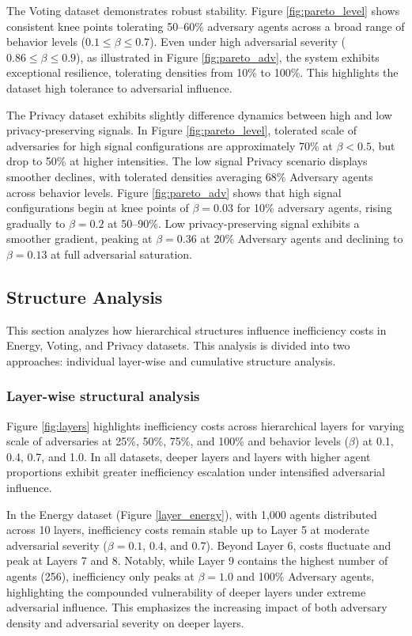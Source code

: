 \documentclass[journal]{IEEEtran}
\begin{document}
The Voting dataset demonstrates robust stability. Figure \ref{fig:pareto_level} shows consistent knee points tolerating 50--60\% adversary agents across a broad range of behavior levels ($0.1 \leq \beta \leq 0.7$). Even under high adversarial severity ($0.86 \leq \beta \leq 0.9$), as illustrated in Figure \ref{fig:pareto_adv}, the system exhibits exceptional resilience, tolerating densities from 10\% to 100\%. This highlights the dataset high tolerance to adversarial influence.

The Privacy dataset exhibits slightly difference dynamics between high and low privacy-preserving signals. In Figure \ref{fig:pareto_level}, tolerated scale of adversaries for high signal configurations are approximately 70\% at $\beta < 0.5$, but drop to 50\% at higher intensities. The low signal Privacy scenario displays smoother declines, with tolerated densities averaging 68\% Adversary agents across behavior levels. Figure \ref{fig:pareto_adv} shows that high signal configurations begin at knee points of $\beta = 0.03$ for 10\% adversary agents, rising gradually to $\beta = 0.2$ at 50--90\%. Low privacy-preserving signal exhibits a smoother gradient, peaking at $\beta = 0.36$ at 20\% Adversary agents and declining to $\beta = 0.13$ at full adversarial saturation.

\subsection{Structure Analysis}
This section analyzes how hierarchical structures influence inefficiency costs in Energy, Voting, and Privacy datasets. This analysis is divided into two approaches: individual layer-wise and cumulative structure analysis.

\subsubsection{Layer-wise structural analysis}
Figure \ref{fig:layers} highlights inefficiency costs across hierarchical layers for varying scale of adversaries at 25\%, 50\%, 75\%, and 100\% and behavior levels ($\beta$) at 0.1, 0.4, 0.7, and 1.0. In all datasets, deeper layers and layers with higher agent proportions exhibit greater inefficiency escalation under intensified adversarial influence.

In the Energy dataset (Figure \ref{layer_energy}), with 1,000 agents distributed across 10 layers, inefficiency costs remain stable up to Layer 5 at moderate adversarial severity ($\beta=0.1$, 0.4, and 0.7). Beyond Layer 6, costs fluctuate and peak at Layers 7 and 8. Notably, while Layer 9 contains the highest number of agents (256), inefficiency only peaks at $\beta=1.0$ and 100\% Adversary agents, highlighting the compounded vulnerability of deeper layers under extreme adversarial influence. This emphasizes the increasing impact of both adversary density and adversarial severity on deeper layers.
\end{document}
